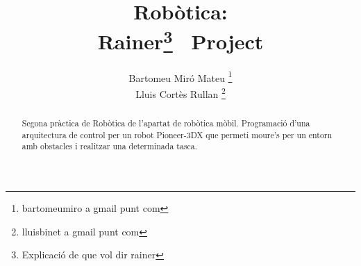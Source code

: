 \documentclass[a4paper,11pt]{scrartcl}
\title{Robòtica: \\ Rainer\footnote{Explicació de que vol dir rainer} \ Project}
\author{ Bartomeu Miró Mateu \thanks{bartomeumiro a gmail punt com} \\
	 Lluis Cortès Rullan \thanks{lluisbinet a gmail punt com} }
\begin{document}
  \maketitle

  \begin{abstract}
    Segona pràctica de Robòtica de l'apartat de robòtica mòbil.
    Programació d'una arquitectura de control per un robot Pioneer-3DX que
    permeti moure’s per un entorn amb obstacles i realitzar una determinada
    tasca.
  \end{abstract}

  \newpage
  \setcounter{page}{2}
  \tableofcontents
  \newpage

  
  
  
  
  
  
\end{document}
